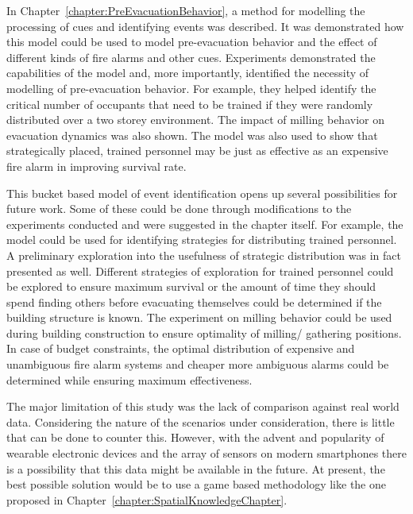 In Chapter~\ref{chapter:PreEvacuationBehavior}, a method for modelling the processing of cues and identifying events was described. It was demonstrated how this model could be used to model pre-evacuation behavior and the effect of different kinds of fire alarms and other cues. Experiments demonstrated the capabilities of the model and, more importantly, identified the necessity of modelling of pre-evacuation behavior. For example, they helped identify the critical number of occupants that need to be trained if they were randomly distributed over a two storey environment. The impact of milling behavior on evacuation dynamics was also shown. The model was also used to show that strategically placed, trained personnel may be just as effective as an expensive fire alarm in improving survival rate.



This bucket based model of event identification opens up several possibilities for future work. Some of these could be done through modifications to the experiments conducted and were suggested in the chapter itself. For example, the model could be used for identifying strategies for distributing trained personnel. A preliminary exploration into the usefulness of strategic distribution was in fact presented as well. Different strategies of exploration for trained personnel could be explored to ensure maximum survival or the amount of time they should spend finding others before evacuating themselves could be determined if the building structure is known. The experiment on milling behavior could be used during building construction to ensure optimality of milling/ gathering positions. In case of budget constraints, the optimal distribution of expensive and unambiguous fire alarm systems and cheaper more ambiguous alarms could be determined while ensuring maximum effectiveness.

The major limitation of this study was the lack of comparison against real world data. Considering the nature of the scenarios under consideration, there is little that can be done to counter this. However, with the advent and popularity of wearable electronic devices and the array of sensors on modern smartphones there is a possibility that this data might be available in the future. At present, the best possible solution would be to use a game based methodology like the one proposed in Chapter~\ref{chapter:SpatialKnowledgeChapter}.

